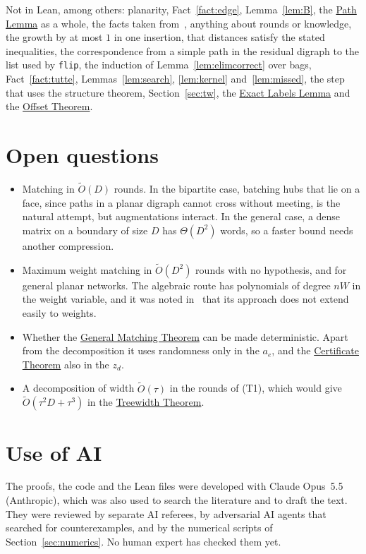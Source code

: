 \documentclass[11pt]{article}
\theoremstyle{definition}
\theoremstyle{remark}
\theoremstyle{plain}
\newcommand{\ThmGen}{\hyperref[thm:gen]{General Matching Theorem}}
\newcommand{\ThmCert}{\hyperref[thm:cert]{Certificate Theorem}}
\newcommand{\ThmTw}{\hyperref[thm:tw]{Treewidth Theorem}}
\newcommand{\LemPath}{\hyperref[lem:path]{Path Lemma}}
\newcommand{\LemLabels}{\hyperref[lem:labels]{Exact Labels Lemma}}
\newcommand{\ThmOff}{\hyperref[thm:off]{Offset Theorem}}
\newcommand{\Ot}{\tilde O}
\begin{document}
Not in Lean, among others: planarity, Fact~\ref{fact:edge}, Lemma~\ref{lem:B}, the \LemPath{} as a whole, the facts taken from~\cite{LP19,P20,IKNS22}, anything about rounds or knowledge, the growth by at most $1$ in one insertion, that distances satisfy the stated inequalities, the correspondence from a simple path in the residual digraph to the list used by \texttt{flip}, the induction of Lemma~\ref{lem:elimcorrect} over bags, Fact~\ref{fact:tutte}, Lemmas~\ref{lem:search}, \ref{lem:kernel} and~\ref{lem:missed}, the step that uses the structure theorem, Section~\ref{sec:tw}, the \LemLabels{} and the \ThmOff{}.

\section{Open questions}\label{sec:open}

\begin{itemize}
\item Matching in $\Ot(D)$ rounds. In the bipartite case, batching hubs that lie on a face, since paths in a planar digraph cannot cross without meeting, is the natural attempt, but augmentations interact. In the general case, a dense matrix on a boundary of size $D$ has $\Theta(D^2)$ words, so a faster bound needs another compression.
\item Maximum weight matching in $\Ot(D^2)$ rounds with no hypothesis, and for general planar networks. The algebraic route has polynomials of degree $nW$ in the weight variable, and it was noted in~\cite{FLPSW18} that its approach does not extend easily to weights.
\item Whether the \ThmGen{} can be made deterministic. Apart from the decomposition it uses randomness only in the $a_e$, and the \ThmCert{} also in the $z_d$.
\item A decomposition of width $\Ot(\tau)$ in the rounds of (T1), which would give $\Ot(\tau^2D+\tau^3)$ in the \ThmTw{}.
\end{itemize}

\section*{Use of AI}

The proofs, the code and the Lean files were developed with Claude Opus~5.5 (Anthropic), which was also used to search the literature and to draft the text. They were reviewed by separate AI referees, by adversarial AI agents that searched for counterexamples, and by the numerical
scripts of Section~\ref{sec:numerics}. No human expert has checked them yet.
\end{document}
